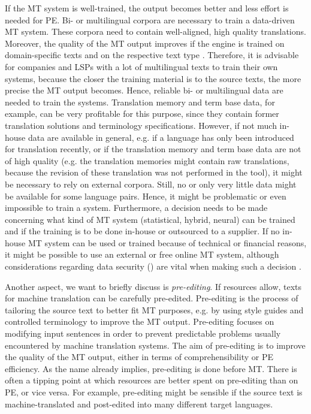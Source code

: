If the MT system is well-trained, the output becomes better and less effort is needed for PE. Bi- or multilingual corpora are necessary to train a data-driven MT system. These corpora need to contain well-aligned, high quality translations. Moreover, the quality of the MT output improves if the engine is trained on domain-specific texts and on the respective text type \citep{gavrila2011training}. Therefore, it is advisable for companies and LSPs with a lot of multilingual texts to train their own systems, because the closer the training material is to the source texts, the more precise the MT output becomes. Hence, reliable bi- or multilingual data are needed to train the systems. Translation memory and term base data, for example, can be very profitable for this purpose, since they contain former translation solutions and terminology specifications. However, if not much in-house data are available in general, e.g. if a language has only been introduced for translation recently, or if the translation memory and term base data are not of high quality (e.g. the translation memories might contain raw translations, because the revision of these translation was not performed in the tool), it might be necessary to rely on external corpora. Still, no or only very little data might be available for some language pairs. Hence, it might be problematic or even impossible to train a system. Furthermore, a decision needs to be made concerning what kind of MT system (statistical, hybrid, neural) can be trained and if the training is to be done in-house or outsourced to a supplier. If no in-house MT system can be used or trained because of technical or financial reasons, it might be possible to use an external or free online MT system, although considerations regarding data security () are vital when making such a decision \citep{kamocki2015all}.

Another aspect, we want to briefly discuss is \textit{pre-editing}. If resources allow, texts for machine translation can be carefully pre-edited. Pre-editing is the process of tailoring the source text to better fit MT purposes, e.g. by using style guides and controlled terminology to improve the MT output. Pre-editing focuses on modifying input sentences in order to prevent predictable problems usually encountered by machine translation systems. The aim of pre-editing is to improve the quality of the MT output, either in terms of comprehensibility or PE efficiency. As the name already implies, pre-editing is done before MT. There is often a tipping point at which resources are better spent on pre-editing than on PE, or vice versa. For example, pre-editing might be sensible if the source text is machine-translated and post-edited into many different target languages.

